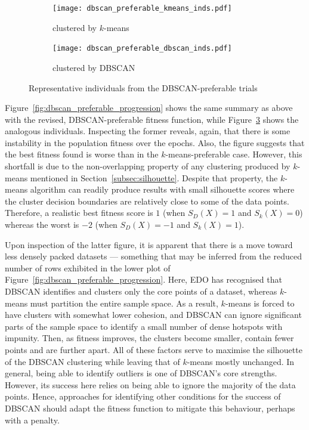 \begin{figure}
    \centering
    \begin{subfigure}{\imgwidth}
        \centering
        \texttt{[image: dbscan\_preferable\_kmeans\_inds.pdf]}
        \caption{%
            clustered by \(k\)-means
        }\label{fig:dbscan_preferable_kmeans_inds}
    \end{subfigure}

    \vspace{1em}
    \begin{subfigure}{\imgwidth}
        \centering
        \texttt{[image: dbscan\_preferable\_dbscan\_inds.pdf]}
        \caption{clustered by DBSCAN}\label{fig:dbscan_preferable_dbscan_inds}
    \end{subfigure}
    \caption{%
        Representative individuals from the DBSCAN-preferable trials
    }\label{fig:dbscan_preferable_inds}
\end{figure}

Figure~\ref{fig:dbscan_preferable_progression} shows the same summary as above
with the revised, DBSCAN-preferable fitness function, while
Figure~\ref{fig:dbscan_preferable_inds} shows the analogous individuals.
Inspecting the former reveals, again, that there is some instability in the
population fitness over the epochs. Also, the figure suggests that the best
fitness found is worse than in the \(k\)-means-preferable case. However, this
shortfall is due to the non-overlapping property of any clustering produced by
\(k\)-means mentioned in Section~\ref{subsec:silhouette}. Despite that property,
the \(k\)-means algorithm can readily produce results with small silhouette
scores where the cluster decision boundaries are relatively close to some of the
data points. Therefore, a realistic best fitness score is \(1\) (when \(S_D(X) =
1\) and \(S_k(X) = 0\)) whereas the worst is \(-2\) (when \(S_D(X) = -1\) and
\(S_k(X) = 1\)).

Upon inspection of the latter figure, it is apparent that there is a move toward
less densely packed datasets --- something that may be inferred from the reduced
number of rows exhibited in the lower plot of
Figure~\ref{fig:dbscan_preferable_progression}. Here, EDO has recognised that
DBSCAN identifies and clusters only the core points of a dataset, whereas
\(k\)-means must partition the entire sample space. As a result, \(k\)-means is
forced to have clusters with somewhat lower cohesion, and DBSCAN can ignore
significant parts of the sample space to identify a small number of dense
hotspots with impunity. Then, as fitness improves, the clusters become smaller,
contain fewer points and are further apart. All of these factors serve to
maximise the silhouette of the DBSCAN clustering while leaving that of
\(k\)-means mostly unchanged. In general, being able to identify outliers is one
of DBSCAN's core strengths. However, its success here relies on being able to
ignore the majority of the data points. Hence, approaches for identifying other
conditions for the success of DBSCAN should adapt the fitness function to
mitigate this behaviour, perhaps with a penalty.  

